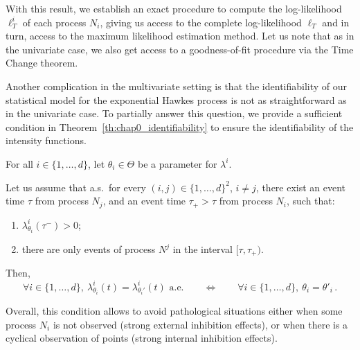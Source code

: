       With this result, we establish an exact procedure to compute the log-likelihood $\ell_T^i$ of each process $N_i$, giving us access to the complete log-likelihood $\ell_T$ and in turn, access to the maximum likelihood estimation method.
      Let us note that as in the univariate case, we also get access to a goodness-of-fit procedure via the Time Change theorem.
      
      Another complication in the multivariate setting is that the identifiability of our statistical model for the exponential Hawkes process is not as straightforward as in the univariate case. 
      To partially answer this question, we provide a sufficient condition in Theorem~\ref{th:chap0_identifiability} to ensure the identifiability of the intensity functions.

      \begin{theorem}[Identifiability]\label{th:chap0_identifiability}
        For all $i\in\{1, \ldots, d\}$, let $\theta_i \in \Theta$ be a parameter for $\lambda^i$.

        Let us assume that a.s.\ for every $(i, j) \in \{1, \dots, d\}^2$, $i\neq j$,
        there exist an event time \(\tau\) from process \(N_j\),
        and an event time \(\tau_+ > \tau\) from process \(N_i\), such that:
        \begin{enumerate}
            \item $\lambda_{\theta_i}^i(\tau^-) > 0$;
            \item there are only events of process $N^j$ in the interval $[\tau, \tau_+)$.
        \end{enumerate} 
        
        Then,
        \[
          \forall i \in \{1, \dots, d\},~
          \lambda_{\theta_i}^i(t) = \lambda_{\theta_i'}^i(t) \text{ a.e.}
          \qquad
          \iff
          \qquad
          \forall i \in \{1, \dots, d\},~\theta_i = \theta'_i\,.
        \]
    \end{theorem}

      Overall, this condition allows to avoid pathological situations either when some process $N_i$ is not observed (strong external inhibition effects), or when there is a cyclical observation of points (strong internal inhibition effects).

